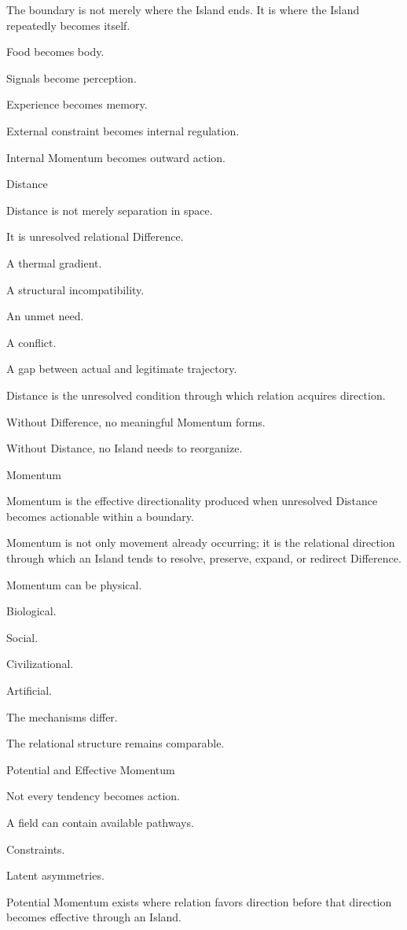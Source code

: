 The boundary is not merely where the Island ends. It is where the Island repeatedly becomes itself.

Food becomes body.

Signals become perception.

Experience becomes memory.

External constraint becomes internal regulation.

Internal Momentum becomes outward action.

Distance

Distance is not merely separation in space.

It is unresolved relational Difference.

A thermal gradient.

A structural incompatibility.

An unmet need.

A conflict.

A gap between actual and legitimate trajectory.

Distance is the unresolved condition through which relation acquires direction.

Without Difference, no meaningful Momentum forms.

Without Distance, no Island needs to reorganize.

Momentum

Momentum is the effective directionality produced when unresolved Distance becomes actionable within a boundary.

Momentum is not only movement already occurring; it is the relational direction through which an Island tends to resolve, preserve, expand, or redirect Difference.

Momentum can be physical.

Biological.

Social.

Civilizational.

Artificial.

The mechanisms differ.

The relational structure remains comparable.

Potential and Effective Momentum

Not every tendency becomes action.

A field can contain available pathways.

Constraints.

Latent asymmetries.

Potential Momentum exists where relation favors direction before that direction becomes effective through an Island.

